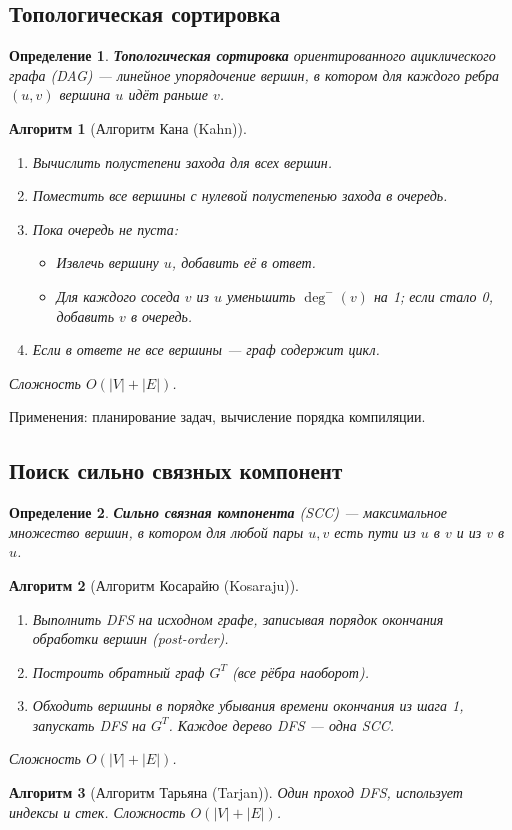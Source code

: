 \documentclass[12pt]{article}
\newtheorem{definition}{Определение}
\newtheorem{algorithm}{Алгоритм}
\begin{document}
\begin{enumerate}
\subsection{Топологическая сортировка}
\begin{definition}
    \textbf{Топологическая сортировка} ориентированного ациклического графа (DAG) — линейное упорядочение вершин, в котором для каждого ребра \((u,v)\) вершина \(u\) идёт раньше \(v\).
\end{definition}
\begin{algorithm}[Алгоритм Кана (Kahn)]
    \begin{enumerate}
        \item Вычислить полустепени захода для всех вершин.
        \item Поместить все вершины с нулевой полустепенью захода в очередь.
        \item Пока очередь не пуста:
            \begin{itemize}
                \item Извлечь вершину \(u\), добавить её в ответ.
                \item Для каждого соседа \(v\) из \(u\) уменьшить \(\deg^-(v)\) на 1; если стало 0, добавить \(v\) в очередь.
            \end{itemize}
        \item Если в ответе не все вершины — граф содержит цикл.
    \end{enumerate}
    Сложность \(O(|V|+|E|)\).
\end{algorithm}
Применения: планирование задач, вычисление порядка компиляции.

\subsection{Поиск сильно связных компонент}
\begin{definition}
    \textbf{Сильно связная компонента} (SCC) — максимальное множество вершин, в котором для любой пары \(u,v\) есть пути из \(u\) в \(v\) и из \(v\) в \(u\).
\end{definition}
\begin{algorithm}[Алгоритм Косарайю (Kosaraju)]
    \begin{enumerate}
        \item Выполнить DFS на исходном графе, записывая порядок окончания обработки вершин (post-order).
        \item Построить обратный граф \(G^T\) (все рёбра наоборот).
        \item Обходить вершины в порядке убывания времени окончания из шага 1, запускать DFS на \(G^T\). Каждое дерево DFS — одна SCC.
    \end{enumerate}
    Сложность \(O(|V|+|E|)\).
\end{algorithm}
\begin{algorithm}[Алгоритм Тарьяна (Tarjan)]
    Один проход DFS, использует индексы и стек. Сложность \(O(|V|+|E|)\).
\end{algorithm}


\end{enumerate}
\end{document}
